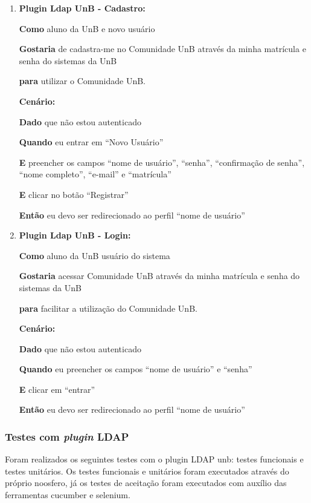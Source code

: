 \begin{enumerate}

\item \textbf{Plugin Ldap UnB - Cadastro:}

\textbf{Como} aluno da UnB e novo usuário

\textbf{Gostaria} de cadastra-me no Comunidade UnB através da minha matrícula e senha do sistemas da UnB

\textbf{para} utilizar o Comunidade UnB.

\textbf{Cenário:}

\textbf{Dado} que não estou autenticado

\textbf{Quando} eu entrar em ``Novo Usuário''

\textbf{E} preencher os campos ``nome de usuário'', ``senha'', ``confirmação de senha'', ``nome completo'', ``e-mail'' e ``matrícula''

\textbf{E} clicar no botão ``Registrar''

\textbf{Então} eu devo ser redirecionado ao perfil ``nome de usuário''


\item  \textbf{Plugin Ldap UnB - Login:}

\textbf{Como} aluno da UnB usuário do sistema

\textbf{Gostaria} acessar Comunidade UnB através da minha matrícula e senha do sistemas da UnB

\textbf{para} facilitar a utilização do Comunidade UnB.

\textbf{Cenário:}

\textbf{Dado} que não estou autenticado

\textbf{Quando} eu preencher os campos ``nome de usuário'' e ``senha''

\textbf{E} clicar em ``entrar''

\textbf{Então} eu devo ser redirecionado ao perfil ``nome de usuário''

\end{enumerate}

\subsubsection{Testes com \textit{plugin} LDAP}
%
Foram realizados os seguintes testes  com o plugin LDAP unb: testes funcionais e testes 
unitários. Os testes funcionais e unitários foram executados através 
do próprio noosfero, já os testes de aceitação foram executados com auxílio das ferramentas cucumber e selenium.
%
